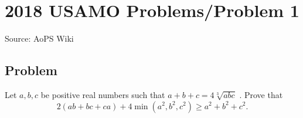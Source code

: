 \documentclass[12pt]{article}
\begin{document}
\section*{{2018 USAMO Problems/Problem 1}}
Source: AoPS Wiki

\subsection*{Problem}
Let $a,b,c$ be positive real numbers such that $a+b+c=4\sqrt[3]{abc}$ . Prove that \[2(ab+bc+ca)+4\min(a^2,b^2,c^2)\ge a^2+b^2+c^2.\]
\end{document}
